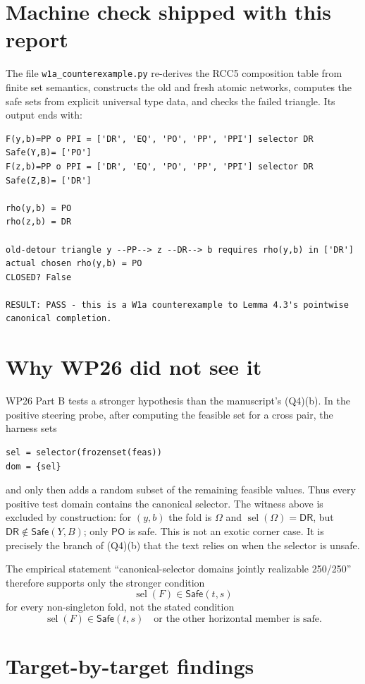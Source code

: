 \documentclass[11pt]{article}
\newcommand{\PO}{\mathsf{PO}}
\newcommand{\DR}{\mathsf{DR}}
\newcommand{\Safe}{\mathsf{Safe}}
\newcommand{\sel}{\operatorname{sel}}
\newcommand{\U}{\Omega}
\begin{document}
\section{Machine check shipped with this report}

The file \texttt{w1a\_counterexample.py} re-derives the RCC5 composition
table from finite set semantics, constructs the old and fresh atomic
networks, computes the safe sets from explicit universal type data, and
checks the failed triangle.  Its output ends with:
\begin{lstlisting}
F(y,b)=PP o PPI = ['DR', 'EQ', 'PO', 'PP', 'PPI'] selector DR Safe(Y,B)= ['PO']
F(z,b)=PP o PPI = ['DR', 'EQ', 'PO', 'PP', 'PPI'] selector DR Safe(Z,B)= ['DR']

rho(y,b) = PO
rho(z,b) = DR

old-detour triangle y --PP--> z --DR--> b requires rho(y,b) in ['DR']
actual chosen rho(y,b) = PO
CLOSED? False

RESULT: PASS - this is a W1a counterexample to Lemma 4.3's pointwise canonical completion.
\end{lstlisting}

\section{Why WP26 did not see it}

WP26 Part B tests a stronger hypothesis than the manuscript's (Q4)(b).
In the positive steering probe, after computing the feasible set for a
cross pair, the harness sets
\begin{lstlisting}
sel = selector(frozenset(feas))
dom = {sel}
\end{lstlisting}
and only then adds a random subset of the remaining feasible values.  Thus
every positive test domain contains the canonical selector.  The witness
above is excluded by construction: for $(y,b)$ the fold is $\U$ and
$\sel(\U)=\DR$, but $\DR\notin\Safe(Y,B)$; only $\PO$ is safe.  This is
not an exotic corner case.  It is precisely the branch of (Q4)(b) that the
text relies on when the selector is unsafe.

The empirical statement ``canonical-selector domains jointly realizable
250/250'' therefore supports only the stronger condition
\[
  \sel(F)\in\Safe(t,s)
\]
for every non-singleton fold, not the stated condition
\[
  \sel(F)\in\Safe(t,s)\quad\text{or the other horizontal member is safe}.
\]

\section{Target-by-target findings}
\end{document}

